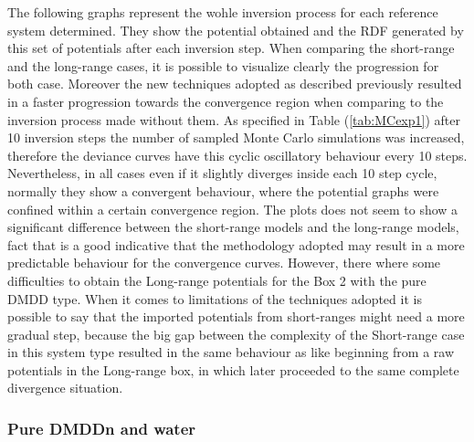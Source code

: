 \documentclass[10pt,a4paper,twoside]{article}
\begin{document}
The following graphs represent the wohle inversion process for each reference system determined. They show the potential obtained and the RDF generated by this set of potentials after each inversion step. When comparing the short-range and the long-range cases, it is possible to visualize clearly the progression for both case. Moreover the new techniques adopted as described previously resulted in a faster progression towards the convergence region when comparing to the inversion process made without them. As specified in Table (\ref{tab:MCexp1}) after 10 inversion steps the number of sampled Monte Carlo simulations was increased, therefore the deviance curves have this cyclic oscillatory behaviour every 10 steps. Nevertheless, in all cases even if it slightly diverges inside each 10 step cycle, normally they show a convergent behaviour, where the potential graphs were confined within a certain convergence region. The plots does not seem to show a significant difference between the short-range models and the long-range models, fact that is a good indicative that the methodology adopted may result in a more predictable behaviour for the convergence curves. However, there where some difficulties to obtain the Long-range potentials for the Box 2 with the pure DMDD type. When it comes to limitations of the techniques adopted it is possible to say that the imported potentials from short-ranges might need a more gradual step, because the big gap between the complexity of the Short-range case in this system type resulted in the same behaviour as like beginning from a raw potentials in the Long-range box, in which later proceeded to the same complete divergence situation.


\subsubsection{Pure DMDDn and water}
\end{document}
